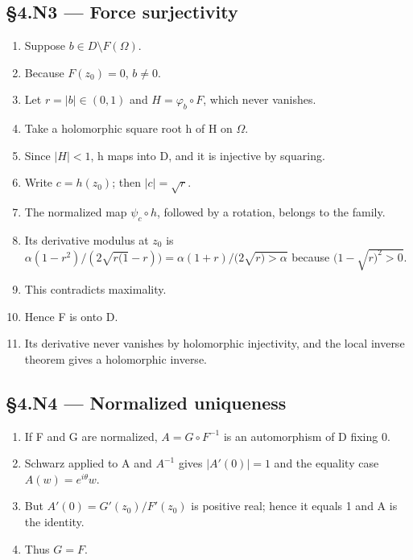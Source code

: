 \documentclass[preprint,12pt,aps,pra,showkeys,amsmath,amssymb,superscriptaddress,floatfix]{revtex4-2}
\theoremstyle{definition}
\theoremstyle{remark}
\begin{document}
\subsection{§4.N3 --- Force surjectivity}\label{n3-force-surjectivity}

\begin{enumerate}
\def\labelenumi{\arabic{enumi}.}
\item
  Suppose \(b\in D\setminus F(\Omega )\).
\item
  Because \(F(z_{0})=0\), \(b\ne 0\).
\item
  Let \(r=|b|\in (0,1)\) and \(H=\varphi _b\circ F\), which never
  vanishes.
\item
  Take a holomorphic square root h of H on \(\Omega\).
\item
  Since \(|H|<1\), h maps into D, and it is injective by squaring.
\item
  Write \(c=h(z_{0})\); then \(|c|=\sqrt{r}\).
\item
  The normalized map \(\psi _c\circ h\), followed by a rotation, belongs
  to the family.
\item
  Its derivative modulus at \(z_{0}\) is
  \(\alpha (1-r^{2})/(2\sqrt{r(1}-r))=\alpha (1+r)/(2\sqrt{r)>\alpha }\)
  because \((1-\sqrt{r)^{2}>0}\).
\item
  This contradicts maximality.
\item
  Hence F is onto D.
\item
  Its derivative never vanishes by holomorphic injectivity, and the
  local inverse theorem gives a holomorphic inverse.
\end{enumerate}

\subsection{§4.N4 --- Normalized
uniqueness}\label{n4-normalized-uniqueness}

\begin{enumerate}
\def\labelenumi{\arabic{enumi}.}
\item
  If F and G are normalized, \(A=G\circ F^{-1}\) is an automorphism of D
  fixing 0.
\item
  Schwarz applied to A and \(A^{-1}\) gives \(|A'(0)|=1\) and the
  equality case \(A(w)=e^{i\theta }w\).
\item
  But \(A'(0)=G'(z_{0})/F'(z_{0})\) is positive real; hence it equals 1
  and A is the identity.
\item
  Thus \(G=F\).
\end{enumerate}
\end{document}
